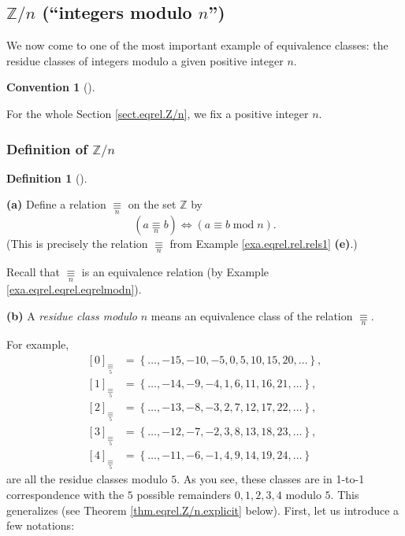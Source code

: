 \documentclass[numbers=enddot,12pt,final,onecolumn,notitlepage]{scrartcl}%
\numberwithin{exer}{subsection}
\theoremstyle{definition}
\newtheorem{defi}[theo]{Definition}
\newenvironment{definition}[1][]
{\begin{defi}[#1]\begin{leftbar}}
{\end{leftbar}\end{defi}}
\newtheorem{conv}[theo]{Convention}
\newenvironment{convention}[1][]
{\begin{conv}[#1]\begin{leftbar}}
{\end{leftbar}\end{conv}}
\begin{document}
\subsection{\label{sect.eqrel.Z/n}$\mathbb{Z}/n$ (\textquotedblleft integers
modulo $n$\textquotedblright)}

We now come to one of the most important example of equivalence classes: the
residue classes of integers modulo a given positive integer $n$.

\begin{convention}
For the whole Section \ref{sect.eqrel.Z/n}, we fix a positive integer $n$.
\end{convention}

\subsubsection{Definition of $\mathbb{Z}/n$}

\begin{definition}
\label{def.eqrel.Z/n.res-class}\textbf{(a)} Define a relation
$\underset{n}{\equiv}$ on the set $\mathbb{Z}$ by
\[
\left(  a\underset{n}{\equiv}b\right)  \Longleftrightarrow\left(  a\equiv
b\operatorname{mod}n\right)  .
\]
(This is precisely the relation $\underset{n}{\equiv}$ from Example
\ref{exa.eqrel.rel.rels1} \textbf{(e)}.)

Recall that $\underset{n}{\equiv}$ is an equivalence relation (by Example
\ref{exa.eqrel.eqrel.eqrelmodn}).

\textbf{(b)} A \textit{residue class modulo}\textbf{ }$n$ means an equivalence
class of the relation $\underset{n}{\equiv}$.
\end{definition}

For example,%
\begin{align*}
\left[  0\right]  _{\underset{5}{\equiv}}  &  =\left\{  \ldots
,-15,-10,-5,0,5,10,15,20,\ldots\right\}  ,\\
\left[  1\right]  _{\underset{5}{\equiv}}  &  =\left\{  \ldots
,-14,-9,-4,1,6,11,16,21,\ldots\right\}  ,\\
\left[  2\right]  _{\underset{5}{\equiv}}  &  =\left\{  \ldots
,-13,-8,-3,2,7,12,17,22,\ldots\right\}  ,\\
\left[  3\right]  _{\underset{5}{\equiv}}  &  =\left\{  \ldots
,-12,-7,-2,3,8,13,18,23,\ldots\right\}  ,\\
\left[  4\right]  _{\underset{5}{\equiv}}  &  =\left\{  \ldots
,-11,-6,-1,4,9,14,19,24,\ldots\right\}
\end{align*}
are all the residue classes modulo $5$. As you see, these classes are in
1-to-1 correspondence with the $5$ possible remainders $0,1,2,3,4$ modulo $5$.
This generalizes (see Theorem \ref{thm.eqrel.Z/n.explicit} below). First, let
us introduce a few notations:
\end{document}
